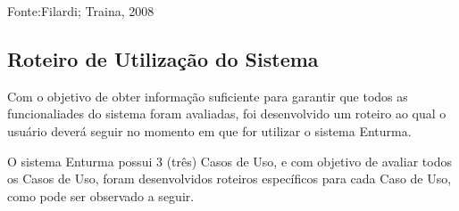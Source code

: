 Fonte:Filardi; Traina, 2008

\subsection{Roteiro de Utilização do Sistema} %
\label{sub:roteiro_de_utiliza_o_do_sistema}
	
	Com o objetivo de obter informação suficiente para garantir que todos as funcionaliades do sistema foram avaliadas, foi desenvolvido um roteiro ao qual o usuário deverá seguir no momento em que for utilizar o sistema Enturma.

	O sistema Enturma possui 3 (três) Casos de Uso, e com objetivo de avaliar todos os Casos de Uso, foram desenvolvidos roteiros específicos para cada Caso de Uso, como pode ser observado a seguir.


